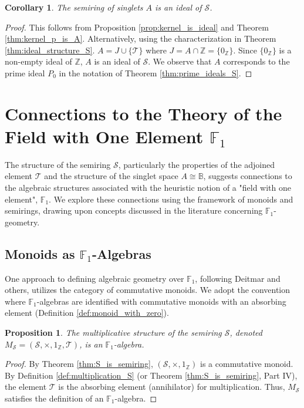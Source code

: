 \documentclass[11pt, a4paper]{article}
\theoremstyle{plain}
\newtheorem{corollary}[theorem]{Corollary}
\newtheorem{proposition}[theorem]{Proposition}
\theoremstyle{definition}
\numberwithin{equation}{section}
\newcommand{\Z}{\mathbb{Z}}
\newcommand{\Tobj}{\mathcal{T}} %
\newcommand{\SemiringS}{\mathcal{S}}
\newcommand{\Bool}{\mathbb{B}}
\newcommand{\FOne}{\mathbb{F}_1}
\begin{document}
\begin{corollary}
The semiring of singlets $A$ is an ideal of $\SemiringS$.
\end{corollary}
\begin{proof}
This follows from Proposition \ref{prop:kernel_is_ideal} and Theorem \ref{thm:kernel_p_is_A}.
Alternatively, using the characterization in Theorem \ref{thm:ideal_structure_S}. $A = J \cup \{\Tobj\}$ where $J=A\cap\Z=\{0_{\Z}\}$. Since $\{0_{\Z}\}$ is a non-empty ideal of $\Z$, $A$ is an ideal of $\SemiringS$. We observe that $A$ corresponds to the prime ideal $P_0$ in the notation of Theorem \ref{thm:prime_ideals_S}.
\end{proof}

\section{Connections to the Theory of the Field with One Element \texorpdfstring{$\FOne$}{F1}}

The structure of the semiring $\SemiringS$, particularly the properties of the adjoined element $\Tobj$ and the structure of the singlet space $A \cong \Bool$, suggests connections to the algebraic structures associated with the heuristic notion of a "field with one element", $\FOne$. We explore these connections using the framework of monoids and semirings, drawing upon concepts discussed in the literature concerning $\FOne$-geometry.

\subsection{Monoids as \texorpdfstring{$\FOne$}{F1}-Algebras}

One approach to defining algebraic geometry over $\FOne$, following Deitmar and others, utilizes the category of commutative monoids. We adopt the convention where $\FOne$-algebras are identified with commutative monoids with an absorbing element (Definition \ref{def:monoid_with_zero}).

\begin{proposition}\label{prop:S_is_F1_algebra}
The multiplicative structure of the semiring $\SemiringS$, denoted $M_{\SemiringS} = (\SemiringS, \times, 1_{\Z}, \Tobj)$, is an $\FOne$-algebra.
\end{proposition}
\begin{proof}
By Theorem \ref{thm:S_is_semiring}, $(\SemiringS, \times, 1_{\Z})$ is a commutative monoid. By Definition \ref{def:multiplication_S} (or Theorem \ref{thm:S_is_semiring}, Part IV), the element $\Tobj$ is the absorbing element (annihilator) for multiplication. Thus, $M_{\SemiringS}$ satisfies the definition of an $\FOne$-algebra.
\end{proof}
\end{document}
